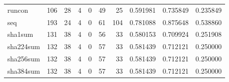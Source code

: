 \begin{longtable}{lrrrrrrrrr}
runcon    &                                                106 &                                                 28 &                                                  4 &                                                  0 &                                                 49 &                                                 25 &                                           0.591981 &                               0.735849 &                             0.235849 \\
seq       &                                                193 &                                                 24 &                                                  4 &                                                  0 &                                                 61 &                                                104 &                                           0.781088 &                               0.875648 &                             0.538860 \\
sha1sum   &                                                131 &                                                 38 &                                                  4 &                                                  0 &                                                 56 &                                                 33 &                                           0.580153 &                               0.709924 &                             0.251908 \\
sha224sum &                                                132 &                                                 38 &                                                  4 &                                                  0 &                                                 57 &                                                 33 &                                           0.581439 &                               0.712121 &                             0.250000 \\
sha256sum &                                                132 &                                                 38 &                                                  4 &                                                  0 &                                                 57 &                                                 33 &                                           0.581439 &                               0.712121 &                             0.250000 \\
sha384sum &                                                132 &                                                 38 &                                                  4 &                                                  0 &                                                 57 &                                                 33 &                                           0.581439 &                               0.712121 &                             0.250000 \\

\end{longtable}
